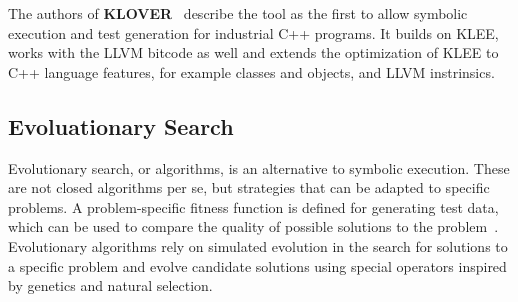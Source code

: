 \documentclass{article}
\begin{document}
The authors of \textbf{KLOVER}~\cite{Li2011} describe the tool as the first to allow symbolic execution and test generation for industrial C++ programs. It builds on KLEE, works with the LLVM bitcode as well and extends the optimization of KLEE to C++ language features, for example classes and objects, and LLVM instrinsics.

\subsection{Evoluationary Search}

Evolutionary search, or algorithms, is an alternative to symbolic execution. These are not closed algorithms per se, but strategies that can be adapted to specific problems. A problem-specific fitness function is defined for generating test data, which can be used to compare the quality of possible solutions to the problem~\cite{McMinn_2004}. Evolutionary algorithms rely on simulated evolution in the search for solutions to a specific problem and evolve candidate solutions using special operators inspired by genetics and natural selection.

\end{document}
